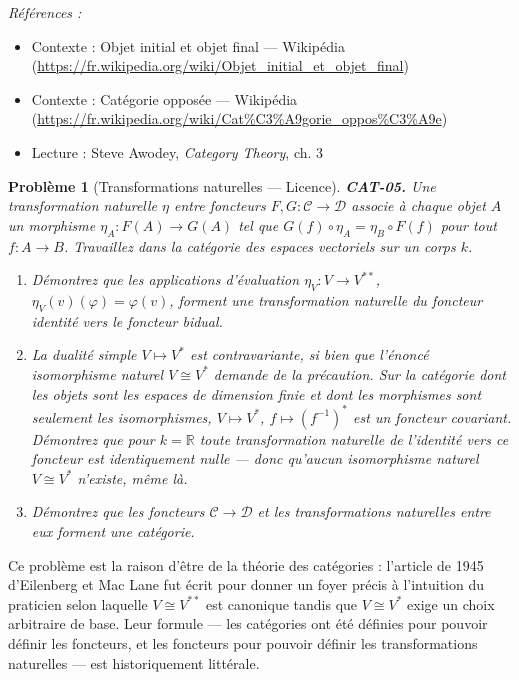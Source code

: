 \documentclass[11pt]{article}
\newtheorem{problem}{Problème}
\newenvironment{refs}{\par\small\noindent\emph{Références :}\begin{itemize}\setlength\itemsep{0pt}}{\end{itemize}\normalsize}
\begin{document}
\begin{refs}
\item Contexte : Objet initial et objet final --- Wikipédia (\url{https://fr.wikipedia.org/wiki/Objet_initial_et_objet_final})
\item Contexte : Catégorie opposée --- Wikipédia (\url{https://fr.wikipedia.org/wiki/Cat%C3%A9gorie_oppos%C3%A9e})
\item Lecture : Steve Awodey, \textit{Category Theory}, ch. 3
\end{refs}

\bigskip

\begin{problem}[{Transformations naturelles --- Licence}]
\textbf{CAT-05.} Une \textit{transformation naturelle} $ \eta $ entre
foncteurs $ F, G\colon \mathcal{C} \to \mathcal{D} $ associe à chaque objet $ A $ un
morphisme $ \eta_A\colon F(A) \to G(A) $ tel que $ G(f) \circ \eta_A = \eta_B \circ F(f) $
pour tout $ f\colon A \to B $. Travaillez dans la catégorie des espaces vectoriels sur un corps $ k $.
\begin{enumerate}
\item[(a)] Démontrez que les applications d'évaluation $ \eta_V\colon V \to V^{**} $, $ \eta_V(v)(\varphi) =
\varphi(v) $, forment une transformation naturelle du foncteur identité vers le foncteur
bidual.
\item[(b)] La dualité simple $ V \mapsto V^{*} $ est contravariante, si bien que l'énoncé
\og{} isomorphisme naturel $ V \cong V^{*} $ \fg{} demande de la précaution. Sur la catégorie dont les
objets sont les espaces de dimension finie et dont les morphismes sont seulement les
isomorphismes, $ V \mapsto V^{*} $, $ f \mapsto (f^{-1})^{*} $ est un foncteur covariant.
Démontrez que pour $ k = \mathbb{R} $ toute transformation naturelle de l'identité vers ce
foncteur est identiquement nulle --- donc qu'aucun isomorphisme naturel $ V \cong V^{*} $
n'existe, même là.
\item[(c)] Démontrez que les foncteurs
$ \mathcal{C} \to \mathcal{D} $ et les transformations naturelles entre eux forment une
catégorie.
\end{enumerate}

\end{problem}

\noindent Ce problème est la raison d'être de la théorie des catégories : l'article de
1945 d'Eilenberg et Mac Lane fut écrit pour donner un foyer précis à l'intuition du praticien
selon laquelle $ V \cong V^{**} $ est canonique tandis que $ V \cong V^{*} $ exige un choix
arbitraire de base. Leur formule --- les catégories ont été définies pour pouvoir définir les
foncteurs, et les foncteurs pour pouvoir définir les transformations naturelles --- est
historiquement littérale.
\end{document}
